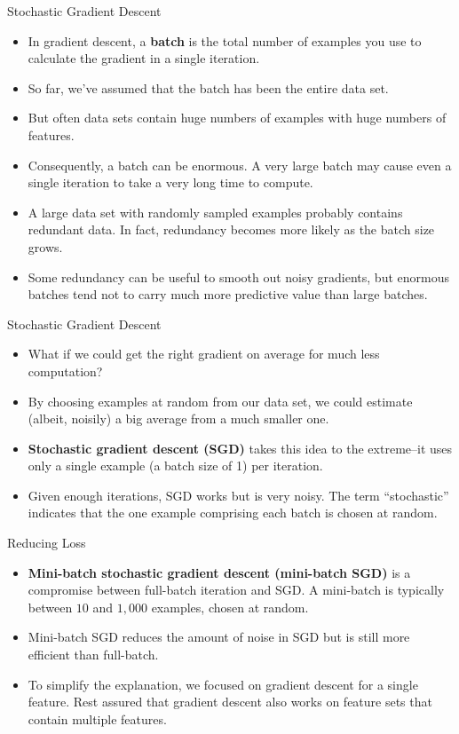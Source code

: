 \documentclass{beamer}
\begin{document}
\begin{frame}{Stochastic Gradient Descent}

\begin{itemize}
    \item In gradient descent, a {\bf batch} is the total number of examples you use to calculate the gradient in a single iteration. 
    \item So far, we've assumed that the batch has been the entire data set. 
    \item But often data sets contain huge numbers of examples with huge numbers of features.
    \item Consequently, a batch can be enormous. A very large batch may cause even a single iteration to take a very long time to compute.
    \item A large data set with randomly sampled examples probably contains redundant data. In fact, redundancy becomes more likely as the batch size grows. 
    \item Some redundancy can be useful to smooth out noisy gradients, but enormous batches tend not to carry much more predictive value than large batches.
\end{itemize}
\end{frame}

\begin{frame}{Stochastic Gradient Descent}

\begin{itemize}
    \item What if we could get the right gradient on average for much less computation? 
    \item By choosing examples at random from our data set, we could estimate (albeit, noisily) a big average from a much smaller one. 
    \item {\bf Stochastic gradient descent (SGD)} takes this idea to the extreme--it uses only a single example (a batch size of 1) per iteration. 
    \item Given enough iterations, SGD works but is very noisy. The term ``stochastic'' indicates that the one example comprising each batch is chosen at random.
\end{itemize}

\end{frame}

\begin{frame}{Reducing Loss}
\begin{itemize}
    \item {\bf Mini-batch stochastic gradient descent (mini-batch SGD)} is a compromise between full-batch iteration and SGD. A mini-batch is typically between $10$ and $1,000$ examples, chosen at random. 
    \item Mini-batch SGD reduces the amount of noise in SGD but is still more efficient than full-batch.
    \item To simplify the explanation, we focused on gradient descent for a single feature. Rest assured that gradient descent also works on feature sets that contain multiple features.
\end{itemize}
\end{frame}
\end{document}
